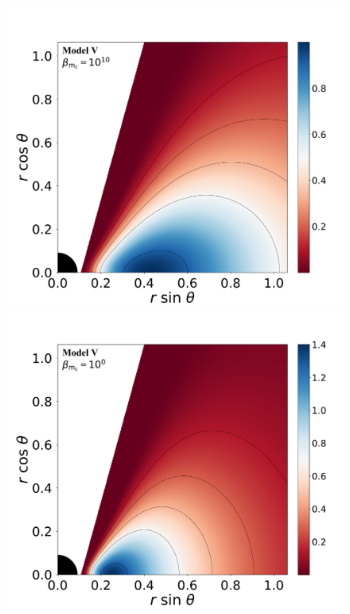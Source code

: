 \documentclass[twocolumn,aps,showpacs,showkeys,prd,superscriptaddress,byrevtex, amsmath]{revtex4-1}
\begin{document}
\begin{figure}
\centering
\includegraphics[scale=0.14]{figures/fig2_V_10.pdf}
\hspace{-0.3cm}
\includegraphics[scale=0.14]{figures/fig2_V_1.pdf}
\hspace{-0.2cm}

\end{figure}
\end{document}
